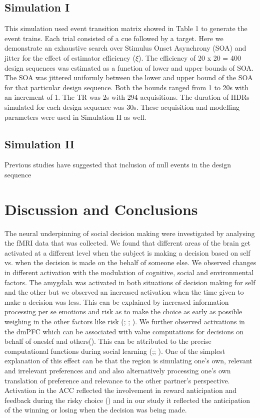 \documentclass[11pt]{article}
\begin{document}
\subsection{Simulation I}
This simulation used event transition matrix showed in Table 1 to generate the event trains. Each trial consisted of a cue followed by a target. Here we demonstrate an exhaustive search over Stimulus Onset Asynchrony (SOA) and jitter for the effect of estimator efficiency (\(\xi\)). The efficiency of 20 x 20 = 400 design sequences was estimated as a function of lower and upper bounds of SOA. The SOA was jittered uniformly between the lower and upper bound of the SOA for that particular design sequence. Both the bounds ranged from 1 to 20s with an increment of 1. The TR was 2s with 294 acquisitions. The duration of HDRs simulated for each design sequence was 30s. These acquisition and modelling parameters were used in Simulation II as well.

\subsection{Simulation II}
Previous studies have suggested that inclusion of null events in the design sequence



\section{Discussion and Conclusions}
The neural underpinning of social decision making were investigated by analysing the fMRI data that was collected. We found that different areas of the brain get activated at a different level when the subject is making a decision based on self vs. when the decision is made on the behalf of someone else. We observed changes in different activation with the modulation of cognitive, social and environmental factors. The amygdala was activated in both situations of decision making for self and the other but we observed an increased activation when the time given to make a decision was less. This can be explained by increased information processing per se emotions and risk as to make the choice as early as possible weighing in the other factors like risk (\citet{ghods2009fundamental}; \citet{smith2009neural}; \citet{morrison2010re}). We further observed activations in the dmPFC which can be associated with value computations for decisions on behalf of oneslef and others(\citet{cohen2005functional}). This can be attributed to the precise computational functions during social learning (\citet{behrens2008associative};\citet{behrens2009computation}; \citet{hampton2008neural}). One of the simplest explanation of this effect can be that the region is simulating one's own, relevant and irrelevant preferences and and also alternatively processing one's own translation of preference and relevance to the other partner's perspective. Activation in the ACC reflected the involvement in reward anticipation and feedback during the risky choice (\citet{ernst2004choice}) and in our study it reflected the anticipation of the winning or losing when the decision was being made. 

\medskip

 
\end{document}
